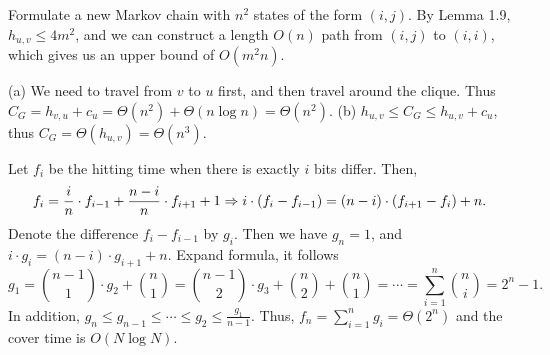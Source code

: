 \documentclass[main.tex]{subfiles}
\begin{document}
 Formulate a new Markov chain with $n^2$ states of the form $(i, j)$. By Lemma 1.9, $h_{u,v}\le 4m^2$, and we can construct a length $O(n)$ path from $(i,j)$ to $(i,i)$, which gives us an upper bound of $O(m^2n)$.

  (a) We need to travel from $v$ to $u$ first, and then travel around the clique. Thus $C_G=h_{v,u}+c_u=\Theta(n^2)+\Theta(n\log n) = \Theta(n^2)$. (b) $h_{u,v}\le C_G \le h_{u,v}+c_u$, thus $C_G=\Theta(h_{u,v}) = \Theta(n^3)$.

  Let $f_i$ be the hitting time when there is exactly $i$ bits differ. Then,
\[
	f_i=\frac{i}{n}\cdot f_{i-1} + \frac{n-i}{n}\cdot f_{i+1} + 1
	\Rightarrow i\cdot(f_i-f_{i-1})=(n-i)\cdot(f_{i+1}-f_{i})+n.
\]
Denote the difference $f_i-f_{i-1}$ by $g_i$. Then we have $g_n=1$, and $i\cdot g_i = (n-i) \cdot g_{i+1} + n$. Expand formula, it follows
\[
	g_1=\binom{n-1}{1}\cdot g_2+\binom{n}{1}=\binom{n-1}{2}\cdot g_3+\binom{n}{2}+\binom{n}{1}=\cdots=\sum_{i=1}^{n}\binom{n}{i}=2^{n}-1.
\]
In addition, $g_n\le g_{n-1}\le \cdots \le g_2 \le \frac{g_1}{n-1}$. Thus, $f_n=\sum_{i=1}^{n} g_i = \Theta(2^n)$ and the cover time is $O(N \log N)$.
\end{document}
